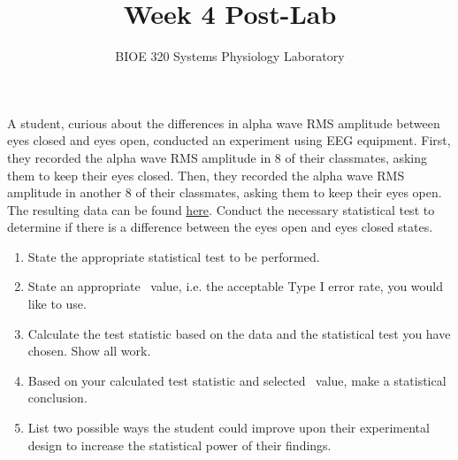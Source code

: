 \documentclass{article}
\title{Week 4 Post-Lab}
\author{BIOE 320 Systems Physiology Laboratory}
\date{}
\begin{document}
\maketitle
\large

A student, curious about the differences in alpha wave RMS amplitude between eyes closed and eyes open, conducted an experiment using EEG equipment. First, they recorded the alpha wave RMS amplitude in 8 of their classmates, asking them to keep their eyes closed. Then, they recorded the alpha wave RMS amplitude in another 8 of their classmates, asking them to keep their eyes open. The resulting data can be found \href{https://jameslong12.github.io/BIOE320/Assignments.html}{here}. Conduct the necessary statistical test to determine if there is a difference between the eyes open and eyes closed states.

\begin{enumerate}
	\item State the appropriate statistical test to be performed.
	\item State an appropriate \textalpha\ value, i.e. the acceptable Type I error rate, you would like to use. 
	\item Calculate the test statistic based on the data and the statistical test you have chosen. Show all work.
	\item Based on your calculated test statistic and selected \textalpha\ value, make a statistical conclusion.
	\item List two possible ways the student could improve upon their experimental design to increase the statistical power of their findings.
\end{enumerate}
\end{document}
